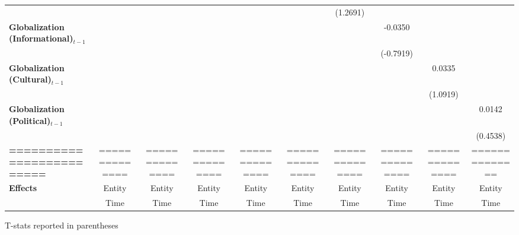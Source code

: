 \begin{center}
\begin{tabular}{lccccccccc}
\textbf{ }                         &                &                  &                  &                  &                  &     (1.2691)     &                  &                  &                   \\
\textbf{Globalization (Informational)$_{t-1}$}             &                &                  &                  &                  &                  &                  &     -0.0350      &                  &                   \\
\textbf{ }                         &                &                  &                  &                  &                  &                  &    (-0.7919)     &                  &                   \\
\textbf{Globalization (Cultural)$_{t-1}$}             &                &                  &                  &                  &                  &                  &                  &      0.0335      &                   \\
\textbf{ }                         &                &                  &                  &                  &                  &                  &                  &     (1.0919)     &                   \\
\textbf{Globalization (Political)$_{t-1}$}             &                &                  &                  &                  &                  &                  &                  &                  &      0.0142       \\
\textbf{ }                         &                &                  &                  &                  &                  &                  &                  &                  &     (0.4538)      \\
\textbf{=========================} & ============== &  ==============  &  ==============  &  ==============  &  ==============  &  ==============  &  ==============  &  ==============  &  ==============   \\
\textbf{Effects}                   &     Entity     &      Entity      &      Entity      &      Entity      &      Entity      &      Entity      &      Entity      &      Entity      &      Entity       \\
\textbf{}                          &      Time      &       Time       &       Time       &       Time       &       Time       &       Time       &       Time       &       Time       &       Time        \\
\bottomrule
\end{tabular}
\end{center}

T-stats reported in parentheses